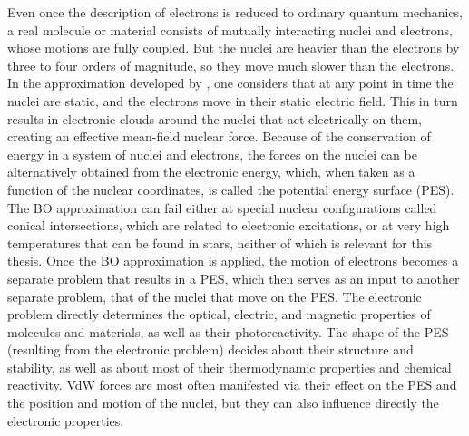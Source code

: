 Even once the description of electrons is reduced to ordinary quantum mechanics, a real molecule or material consists of mutually interacting nuclei and electrons, whose motions are fully coupled.
But the nuclei are heavier than the electrons by three to four orders of magnitude, so they move much slower than the electrons.
In the approximation developed by \citet[BO]{BornAP27}, one considers that at any point in time the nuclei are static, and the electrons move in their static electric field.
This in turn results in electronic clouds around the nuclei that act electrically on them, creating an effective mean-field nuclear force.
Because of the conservation of energy in a system of nuclei and electrons, the forces on the nuclei can be alternatively obtained from the electronic energy, which, when taken as a function of the nuclear coordinates, is called the potential energy surface (PES).
The BO approximation can fail either at special nuclear configurations called conical intersections, which are related to electronic excitations, or at very high temperatures that can be found in stars, neither of which is relevant for this thesis.
Once the BO approximation is applied, the motion of electrons becomes a separate problem that results in a PES, which then serves as an input to another separate problem, that of the nuclei that move on the PES\@.
The electronic problem directly determines the optical, electric, and magnetic properties of molecules and materials, as well as their photoreactivity.
The shape of the PES (resulting from the electronic problem) decides about their structure and stability, as well as about most of their thermodynamic properties and chemical reactivity.
VdW forces are most often manifested via their effect on the PES and the position and motion of the nuclei, but they can also influence directly the electronic properties.

%

